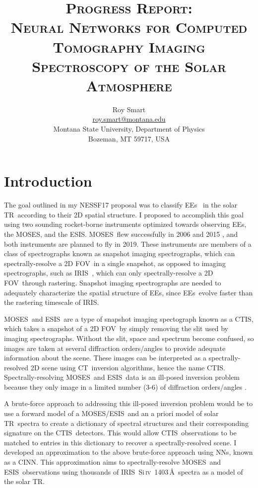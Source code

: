 \documentclass[10pt,letterpaper]{article}
\title{\textsc{Progress Report: \\ Neural Networks for Computed Tomography Imaging Spectroscopy of the Solar Atmosphere}}
\author{Roy Smart \\ \url{roy.smart@montana.edu} \\ Montana State University, Department of Physics \\ Bozeman, MT 59717, USA}
\newcommand{\SiIV}{Si\,\textsc{iv}~1403\,\AA}
\newcommand{\TR}{\ac{TR}}
\newcommand{\EEs}{\acp{EE}}
\newcommand{\CT}{\ac{CT}}
\newcommand{\CTIS}{\ac{CTIS}}
\newcommand{\MOSES}{\ac{MOSES}}
\newcommand{\ESIS}{\ac{ESIS}}
\newcommand{\FOV}{\ac{FOV}}
\newcommand{\NNs}{\acp{NN}}
\newcommand{\CINN}{\ac{CINN}}
\newcommand{\IRIS}{\ac{IRIS}}
\begin{document}
	
	\maketitle
	
	\section{Introduction}
	
		The goal outlined in my NESSF17 proposal was to classify \EEs\ \citep{Brueckner1983} in the solar \TR\ according to their 2D spatial structure.
		I proposed to accomplish this goal using two sounding rocket-borne instruments optimized towards observing \EEs, the \MOSES \citep{kankel1}, and the \ESIS.
		\MOSES\ flew successfully in 2006 \citep{fox1} and 2015 \cite{smart1}, and both instruments are planned to fly in 2019.
		These instruments are members of a class of spectrographs known as snapshot imaging spectrographs, which can spectrally-resolve a 2D \FOV\ in a single snapshot, as opposed to imaging spectrographs, such as \IRIS\ \citep{DePontieu2014}, which can only spectrally-resolve a 2D \FOV\ through rastering.
		Snapshot imaging spectrographs are needed to adequately characterize the spatial structure of \EEs, since \EEs\ evolve faster than the rastering timescale of \IRIS \citep{kankel1,DePontieu2014}.
		
		\MOSES\ and \ESIS\ are a type of snapshot imaging spectograph known as a \CTIS \citep{Okamoto:91}, which takes a snapshot of a 2D \FOV\ by simply removing the slit used by imaging spectrographs.
		Without the slit, space and spectrum become confused, so images are taken at several diffraction orders/angles to provide adequate information about the scene.
		These images can be interpreted as a spectrally-resolved 2D scene using \CT\ inversion algorithms, hence the name \CTIS.
		Spectrally-resolving \MOSES\ and \ESIS\ data is an ill-posed inversion problem because they only image in a limited number (3-6) of diffraction orders/angles \citep{kankel1}.
		
		A brute-force approach to addressing this ill-posed inversion problem would be to use a forward model of a \MOSES/\ESIS\ and an a priori model of solar \TR\ spectra to create a dictionary of spectral structures and their corresponding signature on the \CTIS\ detectors.
		This would allow \CTIS\ observations to be matched to entries in this dictionary to recover a spectrally-resolved scene.
		I developed an approximation to the above brute-force approach using \NNs, known as a \CINN.
		This approximation aims to spectrally-resolve \MOSES\ and \ESIS\ observations using thousands of \IRIS\ \SiIV\ spectra as a model of the solar \TR.
		
\end{document}
